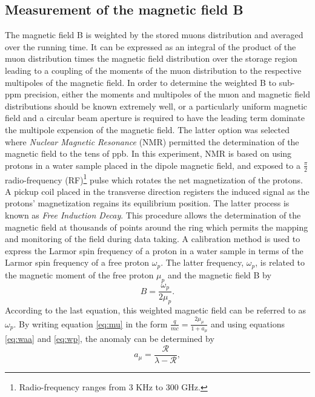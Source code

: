\documentclass{outhesis}
\begin{document}
\subsection{Measurement of the magnetic field B}

The magnetic field B is weighted by the stored muons distribution and averaged over the running time. It can be expressed as an integral of the product of the muon distribution times the magnetic field distribution over the storage region leading to a coupling of the moments of the muon distribution to the respective multipoles of the magnetic field. In order to determine the weighted B to sub-ppm precision, either the moments and multipoles of the muon and magnetic field distributions should be known extremely well, or a particularly uniform magnetic field and a circular beam aperture is required to have the leading term dominate the multipole expension of the magnetic field. The latter option was selected where \emph{Nuclear Magnetic Resonance} (NMR) permitted the determination of the magnetic field to the tens of ppb. In this experiment, NMR is based on using protons in a water sample placed in the dipole magnetic field, and exposed to a $\frac{\pi}{2}$ radio-frequency (RF)\footnote{Radio-frequency ranges from 3 KHz to 300 GHz.} pulse which rotates the net magnetization of the protons. A pickup coil placed in the transverse direction registers the induced signal as the protons' magnetization regains its equilibrium position. The latter process is known as \emph{Free Induction Decay}. This procedure allows the determination of the magnetic field at thousands of points around the ring which permits the mapping and monitoring of the field during data taking. A calibration method is used to express the Larmor spin frequency of a proton in a water sample in terms of the Larmor spin frequency of a free proton $\omega_p$. The latter frequency, $\omega_p$, is related to the magnetic moment of the free proton $\mu_p$ and the magnetic field B by
\begin{equation}
B = \frac{\omega_p}{2\mu_p}.
\label{eq:wp}
\end{equation} 
According to the last equation, this weighted magnetic field can be referred to as $\omega_p$. 
By writing equation \ref{eq:mu} in the form $\displaystyle \frac{q}{mc} = \frac{2\mu_{\mu}}{1+a_{\mu}}$ and using equations \ref{eq:waa} and \ref{eq:wp}, the anomaly can be determined by
\begin{equation}
a_{\mu} = \frac{\mathcal{R}}{\lambda - \mathcal{R}},
\label{eq:R}
\end{equation}
\end{document}
